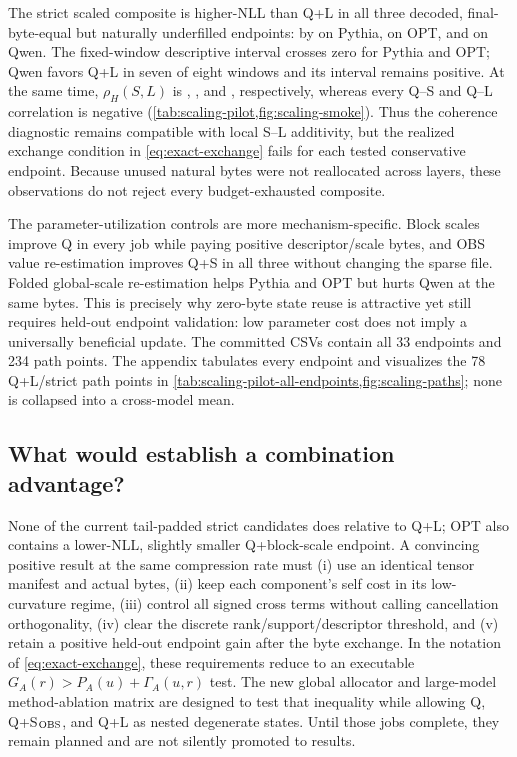 The strict scaled composite is higher-NLL than Q+L in all three decoded,
final-byte-equal but naturally underfilled endpoints: by
\ScalePilotPythiaStrictMinusQLNLL{} on Pythia,
\ScalePilotOPTStrictMinusQLNLL{} on OPT, and
\ScalePilotQwenStrictMinusQLNLL{} on Qwen.  The fixed-window descriptive
interval crosses zero for Pythia and OPT; Qwen favors Q+L in seven of eight
windows and its interval remains positive.  At the same time,
$\rho_H(S,L)$ is \ScalePilotPythiaStrictSLRho{},
\ScalePilotOPTStrictSLRho{}, and \ScalePilotQwenStrictSLRho{}, respectively,
whereas every Q--S and Q--L correlation is negative
(\cref{tab:scaling-pilot,fig:scaling-smoke}).  Thus the coherence diagnostic
remains compatible with local S--L additivity, but the realized exchange
condition in \cref{eq:exact-exchange} fails for each tested conservative
endpoint.  Because unused natural bytes were not reallocated across layers,
these observations do not reject every budget-exhausted composite.

The parameter-utilization controls are more mechanism-specific.  Block scales
improve Q in every job while paying positive descriptor/scale bytes, and OBS
value re-estimation improves Q+S in all three without changing the sparse file.
Folded global-scale re-estimation helps Pythia and OPT but hurts Qwen at the
same bytes.  This is precisely why zero-byte state reuse is attractive yet
still requires held-out endpoint validation: low parameter cost does not imply
a universally beneficial update.  The committed CSVs contain all 33 endpoints
and 234 path points.  The appendix tabulates every endpoint and visualizes the
78 Q+L/strict path points in
\cref{tab:scaling-pilot-all-endpoints,fig:scaling-paths}; none is collapsed
into a cross-model mean.

\subsection{What would establish a combination advantage?}

None of the current tail-padded strict candidates does relative to Q+L; OPT also contains
a lower-NLL, slightly smaller Q+block-scale endpoint.  A convincing positive
result at the same
compression rate must (i) use an identical tensor manifest and actual bytes,
(ii) keep each component's self cost in its low-curvature regime, (iii) control
all signed cross terms without calling cancellation orthogonality, (iv) clear
the discrete rank/support/descriptor threshold, and (v) retain a positive
held-out endpoint gain after the byte exchange.  In the notation of
\cref{eq:exact-exchange}, these requirements reduce to an executable
$G_A(r)>P_A(u)+\Gamma_A(u,r)$ test.  The new global allocator and large-model
method-ablation matrix are designed to test that inequality while allowing Q,
Q+S$_{\rm OBS}$, and Q+L as nested degenerate states.  Until those jobs
complete, they remain planned and are not silently promoted to results.

